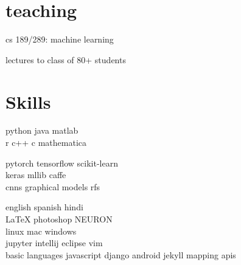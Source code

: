  

\newpage %

\begin{minipage}[t]{0.32\textwidth} %

\sectionspace

\section{teaching}

\vspace{\topsep} %

\begin{tightitemize}
\item cs 189/289: machine learning 
\item lectures to class of 80+ students \href{https://csinva.github.io/pres/189/#/}{\faChain} 
\end{tightitemize}

\sectionspace

\section{Skills}

python \textbullet{} java \textbullet{}  matlab \\ 
r \textbullet{} c++ \textbullet{} c \textbullet{} mathematica\\
\sectionspace %

pytorch \textbullet{} tensorflow \textbullet{} scikit-learn \\
keras \textbullet{} mllib \textbullet{} caffe\\ 
cnns \textbullet{} graphical models \textbullet{} rfs \\
\sectionspace %

english \textbullet{} spanish \textbullet{} hindi\\ 
\LaTeX \textbullet{} photoshop \textbullet{} NEURON\\
linux \textbullet{} mac \textbullet{} windows\\ 
jupyter \textbullet{} intellij \textbullet{} eclipse \textbullet{} vim \\
basic languages \textbullet{} javascript \textbullet{} django android \textbullet{} jekyll \textbullet{} mapping apis\\


\end{minipage}
